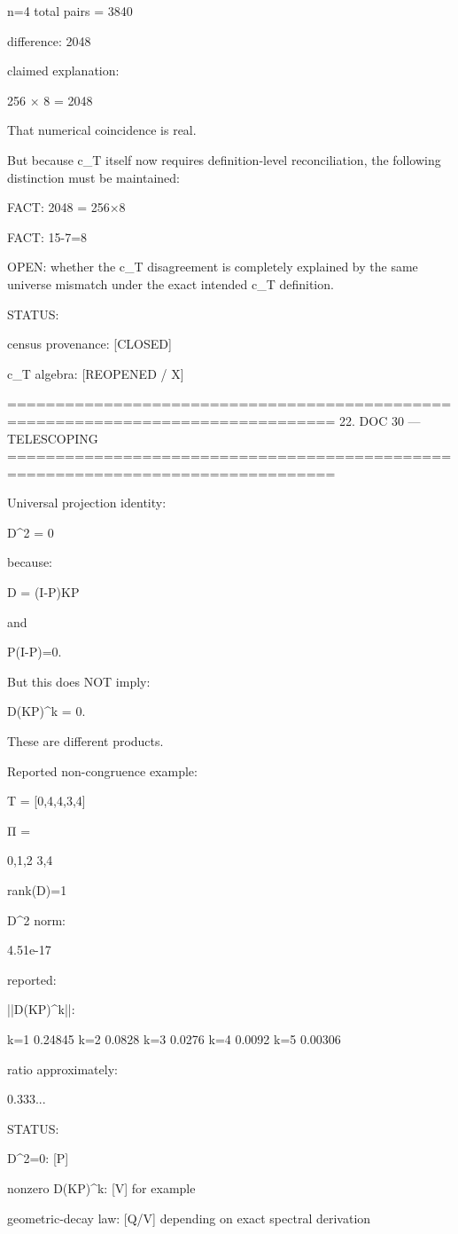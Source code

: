 n=4
total pairs = 3840

difference:
2048

claimed explanation:

256 × 8 = 2048

That numerical coincidence is real.

But because c_T itself now requires definition-level reconciliation,
the following distinction must be maintained:

FACT:
2048 = 256×8

FACT:
15-7=8

OPEN:
whether the c_T disagreement is completely explained by the
same universe mismatch under the exact intended c_T definition.

STATUS:

census provenance:
[CLOSED]

c_T algebra:
[REOPENED / X]

================================================================================
22. DOC 30 — TELESCOPING
================================================================================

Universal projection identity:

D^2 = 0

because:

D = (I-P)KP

and

P(I-P)=0.

But this does NOT imply:

D(KP)^k = 0.

These are different products.

Reported non-congruence example:

T = [0,4,4,3,4]

Π =

{0,1,2}
{3,4}

rank(D)=1

D^2 norm:

4.51e-17

reported:

||D(KP)^k||:

k=1  0.24845
k=2  0.0828
k=3  0.0276
k=4  0.0092
k=5  0.00306

ratio approximately:

0.333...

STATUS:

D^2=0:
[P]

nonzero D(KP)^k:
[V] for example

geometric-decay law:
[Q/V] depending on exact spectral derivation

